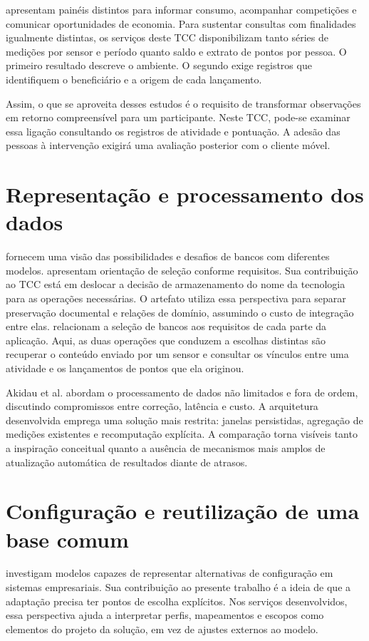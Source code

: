 \documentclass[tcc,capa]{texufpel}
\newif\ifemrevisao
\newcommand{\tintarevisao}{\ifemrevisao\color{correvisao}\fi}
\DeclareRobustCommand{\rev}[1]{{\tintarevisao #1}}
\begin{document}
\rev{\citet{iria2020} apresentam painéis distintos para informar consumo, acompanhar competições e comunicar oportunidades de economia. Para sustentar consultas com finalidades igualmente distintas, os serviços deste TCC disponibilizam tanto séries de medições por sensor e período quanto saldo e extrato de pontos por pessoa. O primeiro resultado descreve o ambiente. O segundo exige registros que identifiquem o beneficiário e a origem de cada lançamento.}

\rev{Assim, o que se aproveita desses estudos é o requisito de transformar observações em retorno compreensível para um participante. Neste TCC, pode-se examinar essa ligação consultando os registros de atividade e pontuação. A adesão das pessoas à intervenção exigirá uma avaliação posterior com o cliente móvel.}

\section{Representação e processamento dos dados}
\citet{grolinger2013} fornecem uma visão das possibilidades e desafios de bancos com diferentes modelos. \citet{gessert2017} apresentam orientação de seleção conforme requisitos. Sua contribuição ao TCC está em deslocar a decisão de armazenamento do nome da tecnologia para as operações necessárias. O artefato utiliza essa perspectiva para separar preservação documental e relações de domínio, assumindo o custo de integração entre elas. \rev{\citet{royhubara2022} relacionam a seleção de bancos aos requisitos de cada parte da aplicação. Aqui, as duas operações que conduzem a escolhas distintas são recuperar o conteúdo enviado por um sensor e consultar os vínculos entre uma atividade e os lançamentos de pontos que ela originou.}

Akidau et al. \cite{akidau2015} abordam o processamento de dados não limitados e fora de ordem, discutindo compromissos entre correção, latência e custo. A arquitetura desenvolvida emprega uma solução mais restrita: janelas persistidas, agregação de medições existentes e recomputação explícita. A comparação torna visíveis tanto a inspiração conceitual quanto a ausência de mecanismos mais amplos de atualização automática de resultados diante de atrasos.

\section{Configuração e reutilização de uma base comum}
\citet{rosemann2007} investigam modelos capazes de representar alternativas de configuração em sistemas empresariais. Sua contribuição ao presente trabalho é a ideia de que a adaptação precisa ter pontos de escolha explícitos. Nos serviços desenvolvidos, essa perspectiva ajuda a interpretar perfis, mapeamentos e escopos como elementos do projeto da solução, em vez de ajustes externos ao modelo.
\end{document}
